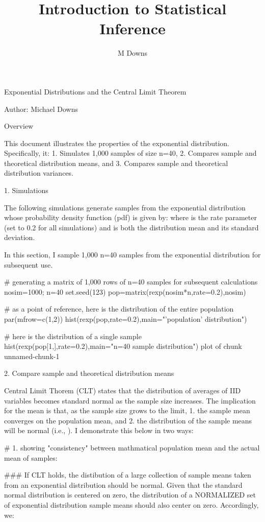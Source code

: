 \documentclass[11pt, oneside]{article}   	%
\title{Introduction to Statistical Inference}
\author{M Downs}
\begin{document}
\maketitle


Exponential Distributions and the Central Limit Theorem

Author: Michael Downs

Overview

This document illustrates the properties of the exponential distribution. Specifically, it: 1. Simulates 1,000 samples of size n=40, 2. Compares sample and theoretical distribution means, and 3. Compares sample and theoretical distribution variances.

1. Simulations

The following simulations generate samples from the exponential distribution whose probability density function (pdf) is given by:
where  is the rate parameter (set to 0.2 for all simulations) and  is both the distribution mean and its standard deviation.

In this section, I sample 1,000 n=40 samples from the exponential distribution for subsequent use.

# generating a matrix of 1,000 rows of n=40 samples for subsequent calculations
nosim=1000; n=40
set.seed(123)
pop=matrix(rexp(nosim*n,rate=0.2),nosim)

# as a point of reference, here is the distribution of the entire population 
par(mfrow=c(1,2))
hist(rexp(pop,rate=0.2),main="'population' distribution")

# here is the distribution of a single sample
hist(rexp(pop[1,],rate=0.2),main="n=40 sample distribution") 
plot of chunk unnamed-chunk-1

2. Compare sample and theoretical distribution means

Central Limit Thorem (CLT) states that the distribution of averages of IID variables becomes standard normal as the sample size increases.
The implication for the mean is that, as the sample size grows to the limit, 1. the sample mean converges on the population mean, and 2. the distribution of the sample means will be normal (i.e., ). I demonstrate this below in two ways:

# 1. showing "consistency" between mathmatical population mean and the actual mean of samples:

### If CLT holds, the distibution of a large collection of sample means taken from an exponential distribution should be normal. Given that the standard normal distribution is centered on zero, the distribution of a NORMALIZED set of exponential distribution sample means should also center on zero. Accordingly, we:
\end{document}
